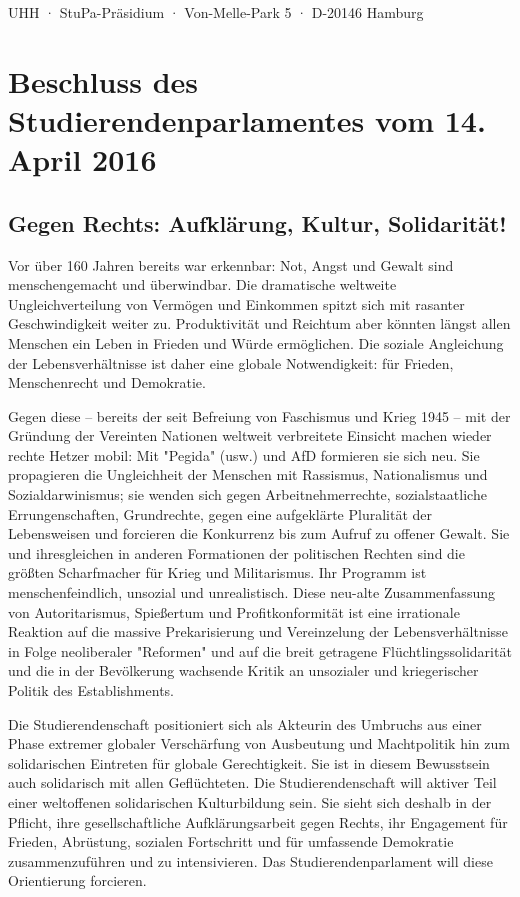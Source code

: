 \documentclass[ngerman,headheight=70pt]{scrartcl}
\begin{document}
    UHH · StuPa-Präsidium · Von-Melle-Park 5 · D-20146 Hamburg

    \section*{Beschluss des Studierendenparlamentes vom 14. April 2016}
    \subsection*{Gegen Rechts: Aufklärung, Kultur, Solidarität!}

	Vor über 160 Jahren bereits war erkennbar: Not, Angst und Gewalt sind
    menschengemacht und überwindbar. Die dramatische weltweite Ungleichverteilung
    von Vermögen und Einkommen spitzt sich mit rasanter Geschwindigkeit weiter zu.
    Produktivität und Reichtum aber könnten längst allen Menschen ein Leben in
    Frieden und Würde ermöglichen. Die soziale Angleichung der Lebensverhältnisse ist
	daher eine globale Notwendigkeit: für Frieden, Menschenrecht und Demokratie.

    Gegen diese – bereits der seit Befreiung von Faschismus und Krieg 1945 – mit
    der Gründung der Vereinten Nationen weltweit verbreitete Einsicht machen
    wieder rechte Hetzer mobil: Mit "Pegida" (usw.) und AfD formieren sie sich neu.
    Sie propagieren die Ungleichheit der Menschen mit Rassismus, Nationalismus und
    Sozialdarwinismus; sie wenden sich gegen Arbeitnehmerrechte, sozialstaatliche
    Errungenschaften, Grundrechte, gegen eine aufgeklärte Pluralität der Lebensweisen
    und forcieren die Konkurrenz bis zum Aufruf zu offener Gewalt. Sie und
    ihresgleichen in anderen Formationen der politischen Rechten sind die größten
    Scharfmacher für Krieg und Militarismus. Ihr Programm ist menschenfeindlich,
    unsozial und unrealistisch. Diese neu-alte Zusammenfassung von Autoritarismus,
    Spießertum und Profitkonformität ist eine irrationale Reaktion auf die massive
    Prekarisierung und Vereinzelung der Lebensverhältnisse in Folge neoliberaler
    "Reformen" und auf die breit getragene Flüchtlingssolidarität und die in der
    Bevölkerung wachsende Kritik an unsozialer und kriegerischer Politik des
    Establishments.

    Die Studierendenschaft positioniert sich als Akteurin des Umbruchs aus einer
    Phase extremer globaler Verschärfung von Ausbeutung und Machtpolitik hin zum
    solidarischen Eintreten für globale Gerechtigkeit. Sie ist in diesem
    Bewusstsein auch solidarisch mit allen Geflüchteten. Die Studierendenschaft
    will aktiver Teil einer weltoffenen solidarischen Kulturbildung sein. Sie sieht
    sich deshalb in der Pflicht, ihre gesellschaftliche Aufklärungsarbeit gegen
    Rechts, ihr Engagement für Frieden, Abrüstung, sozialen Fortschritt und für
    umfassende Demokratie zusammenzuführen und zu intensivieren. Das
    Studierendenparlament will diese Orientierung forcieren.
\end{document}
